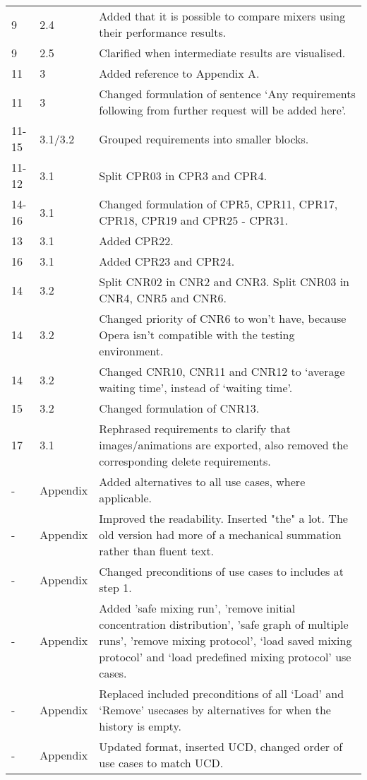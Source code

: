 \begin{longtable}{|l|l|p{11cm}|}
    9 & 2.4 & Added that it is possible to compare mixers using their performance results. \\
    9 & 2.5 & Clarified when intermediate results are visualised. \\
    11 & 3 & Added reference to Appendix A.\\
    11 & 3 & Changed formulation of sentence `Any requirements following from further request will be added here'.\\
    11-15 & 3.1/3.2 & Grouped requirements into smaller blocks.\\
    11-12 & 3.1 & Split CPR03 in CPR3 and CPR4.\\
    14-16 & 3.1 & Changed formulation of CPR5, CPR11, CPR17, CPR18, CPR19 and CPR25 - CPR31.\\
    13 & 3.1 & Added CPR22.\\
    16 & 3.1 & Added CPR23 and CPR24.\\
    14 & 3.2 & Split CNR02 in CNR2 and CNR3. Split CNR03 in CNR4, CNR5 and CNR6.\\
    14 & 3.2 & Changed priority of CNR6 to won't have, because Opera isn't compatible with the testing environment.\\
    14 & 3.2 & Changed CNR10, CNR11 and CNR12 to `average waiting time', instead of `waiting time'.\\
    15 & 3.2 & Changed formulation of CNR13.\\
    17 & 3.1 & Rephrased requirements to clarify that images/animations are exported, also removed the corresponding delete requirements. \\
    - & Appendix & Added alternatives to all use cases, where applicable.\\
    - & Appendix & Improved the readability. Inserted "the" a lot. The old version had more of a mechanical summation rather than fluent text.\\
    - & Appendix & Changed preconditions of use cases to includes at step 1. \\
    - & Appendix & Added 'safe mixing run', 'remove initial concentration distribution', 'safe graph of multiple runs', 'remove mixing protocol', `load saved mixing protocol' and `load predefined mixing protocol' use cases.\\
    - & Appendix & Replaced included preconditions of all `Load' and `Remove' usecases by alternatives for when the history is empty. \\
    - & Appendix & Updated format, inserted UCD, changed order of use cases to match UCD.\\

\end{longtable}
